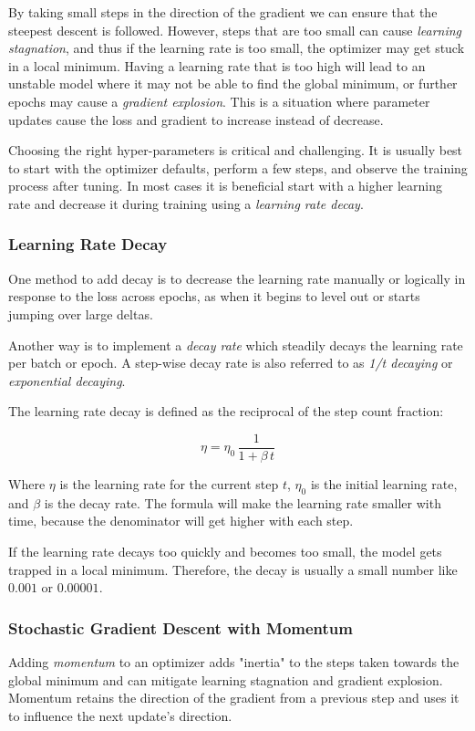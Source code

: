 \documentclass[a4paper]{article}
\begin{document}
By taking small steps in the direction of the gradient we can ensure that the steepest descent is followed. However, steps that are too small can cause \emph{learning stagnation}, and thus if the learning rate is too small, the optimizer may get stuck in a local minimum. Having a learning rate that is too high will lead to an unstable model where it may not be able to find the global minimum, or further epochs may cause a \emph{gradient explosion}. This is a situation where parameter updates cause the loss and gradient to increase instead of decrease.

Choosing the right hyper-parameters is critical and challenging. It is usually best to start with the optimizer defaults, perform a few steps, and observe the training process after tuning. In most cases it is beneficial start with a higher learning rate and decrease it during training using a \emph{learning rate decay}.

\subsubsection*{Learning Rate Decay}
One method to add decay is to decrease the learning rate manually or logically in response to the loss across epochs, as when it begins to level out or starts jumping over large deltas. 

Another way is to implement a \emph{decay rate} which steadily decays the learning rate per batch or epoch. A step-wise decay rate is also referred to as \emph{1/t decaying} or \emph{exponential decaying}. 

\pagebreak
The learning rate decay is defined as the reciprocal of the step count fraction:

\begin{equation*}
    \eta = \eta_0 \, \frac{1}{1 + \beta \, t}
\end{equation*}

Where $\eta$ is the learning rate for the current step $t$, $\eta_0$ is the initial learning rate, and $\beta$ is the decay rate. The formula will make the learning rate smaller with time, because the denominator will get higher with each step.

If the learning rate decays too quickly and becomes too small, the model gets trapped in a local minimum. Therefore, the decay is usually a small number like $0.001$ or $0.00001$.

\subsubsection*{Stochastic Gradient Descent with Momentum}
Adding \emph{momentum} to an optimizer adds "inertia" to the steps taken towards the global minimum and can mitigate learning stagnation and gradient explosion. Momentum retains the direction of the gradient from a previous step and uses it to influence the next update's direction.
\end{document}
